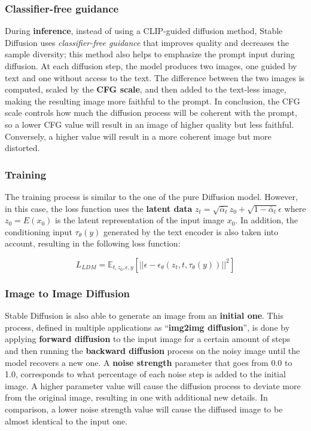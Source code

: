 \documentclass[preprint]{elsarticle}
\begin{document}
\subsubsection{Classifier-free guidance}

During \textbf{inference}, instead of using a CLIP-guided diffusion method, Stable Diffusion uses 
\emph{classifier-free guidance} \cite{ho2022classifierfree} that improves quality and decreases the sample diversity;  this method also helps to emphasize the prompt input during diffusion. 
At each diffusion step, the model produces two images, one guided by text and one without access to the text.  The difference between the two images is computed, scaled by the \textbf{CFG scale}, and then added to the text-less image,  making the resulting image more faithful to the prompt. 
In conclusion, the CFG scale controls how much the diffusion process will be coherent with the prompt, so a lower CFG value will result in an image of higher quality but less faithful. Conversely, a higher value will result in a more coherent image but more distorted.


\subsubsection{Training}

The training process is similar to the one of the pure Diffusion model.
However, in this case, the loss function uses the \textbf{latent data} $z_t=\sqrt{\bar{\alpha}_t}z_0 + \sqrt{1-\bar{\alpha}_t}\epsilon$ where $z_0 = E(x_0)$ is the latent representation of the input image $x_0$. In addition, the conditioning input $\tau_\theta(y)$ generated by the text encoder is also taken into account, resulting in the following loss function:

\begin{equation}
	L_{LDM} = \mathbb{E}_{t,z_0,\epsilon,y}\left[||\epsilon-\epsilon_\theta(z_t,t,\tau_\theta(y))||^2\right]
\end{equation}



\subsubsection{Image to Image Diffusion}

Stable Diffusion is also able to generate an image from an \textbf{initial one}. This process, defined in multiple applications  as ``\textbf{img2img diffusion}'', is done by applying \textbf{forward diffusion} to the input image for a certain amount of steps and then running the \textbf{backward diffusion} process on the noisy image until the model recovers a new one. A \textbf{noise strength} parameter  that goes from 0.0 to 1.0, corresponds to what percentage of each noise step is added to the initial image. 
A higher parameter value will cause the diffusion process to deviate more from the original image, resulting in one with additional new details. In comparison, a lower noise strength value will cause the diffused image to be almost identical to the input one.
\end{document}
